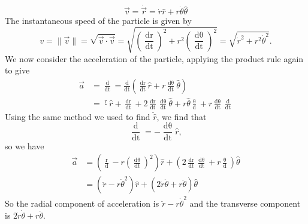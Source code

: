\begin{equation}
    \vec{v} = \dot{\vec{r}} = \dot{r} \hat{r} + r \dot{\theta} \hat{\theta}
\end{equation}
The instantaneous speed of the particle  is given by
\begin{equation}
    \label{eq:polar-speed}
    v = \| \vec{v} \| = \sqrt{\vec{v} \cdot \vec{v}} = \sqrt{\left(\frac{\mathop{\mathrm{d}r}}{\mathop{\mathrm{d} t}}\right)^2 + r^2 \left(\frac{\mathop{\mathrm{d} \theta}}{\mathop{\mathrm{d} t}}\right)^2} = \sqrt{\dot{r}^2 + r^2 \dot{\theta}^2}.
\end{equation}
We now consider the acceleration of the particle, applying the product rule again to give
\begin{align*}
    \vec{a} &= \frac{\mathop{\mathrm{d}\vec{v}}}{\mathop{\mathrm{d}t}} = \frac{\mathrm{d}}{\mathop{\mathrm{dt}}} \left(\frac{\mathop{\mathrm{d}r}}{\mathop{\mathrm{d} t}} \hat{r} + r \frac{\mathop{\mathrm{d} \theta}}{\mathop{\mathrm{d} t}} \hat{\theta}\right) \\
    &= \frac{\mathop{\mathrm{d}^2 r}}{\mathop{\mathrm{dt^2}}} \hat{r} + \frac{\mathop{\mathrm{d}r}}{\mathop{\mathrm{d}t}} + 2 \frac{\mathop{\mathrm{d}r}}{\mathop{\mathrm{d}t}}\frac{\mathop{\mathrm{d}\theta}}{\mathop{\mathrm{d}t}} \hat{\theta} + r \hat{\theta} \frac{\mathop{\mathrm{d}^2 \theta}}{\mathop{\mathrm{d}t^2}} + r \frac{\mathop{\mathrm{d}\theta}}{\mathop{\mathrm{d}t}} \frac{\mathop{\mathrm{d}\hat{\theta}}}{\mathop{\mathrm{d}t}}
\end{align*}
Using the same method we used to find $\ddot{\hat{r}}$, we find that
\begin{equation*}
    \frac{\mathop{\mathrm{d} \hat{\theta}}}{\mathop{\mathrm{d} t}} = - \frac{\mathop{\mathrm{d} \theta}}{\mathop{\mathrm{d} t}} \hat{r},
\end{equation*}
so we have
\begin{align}
    \vec{a} &= \left(\frac{\mathop{\mathrm{d}^2 r}}{\mathop{\mathrm{d}t^2}} - r \left(\frac{\mathop{\mathrm{d}\theta}}{\mathop{\mathrm{d}t}}\right)^2 \right) \hat{r} + \left(2 \frac{\mathop{\mathrm{d}r}}{\mathop{\mathrm{d}t}} \frac{\mathop{\mathrm{d}\theta}}{\mathop{\mathrm{d}t}} + r \frac{\mathop{\mathrm{d}^2 \theta}}{\mathop{\mathrm{d}t^2}}\right) \hat{\theta} \\
    &= \left(\ddot{r} - r \dot{\theta}^2 \right) \hat{r} + \left(2 \dot{r} \dot{\theta} + r \ddot{\theta}\right) \hat{\theta}
\end{align}
So the radial component of acceleration is $\ddot{r} - r \dot{\theta}^2$ and the transverse component is $2 \dot{r} \dot{\theta} + r \ddot{\theta}$.


